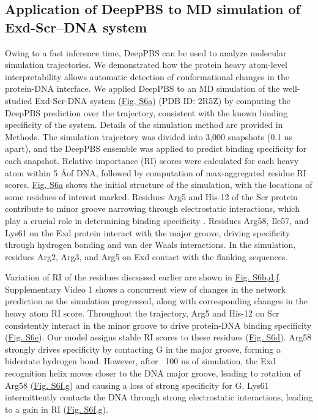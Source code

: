 \subsection{Application of DeepPBS to MD simulation of Exd-Scr–DNA system}

Owing to a fast inference time, DeepPBS can be used to analyze molecular simulation trajectories. We demonstrated how the protein heavy atom-level interpretability allows automatic detection of conformational changes in the protein-DNA interface. We applied DeepPBS to an MD simulation of the well-studied Exd-Scr-DNA system (\hyperref[fig:pdnaS6]{Fig. S6a}) (PDB ID: 2R5Z)\citep{Abe2015, Chiu2022, Ghoshdastidar2022, Slattery2011} by computing the DeepPBS prediction over the trajectory, consistent with the known binding specificity \citep{Abe2015} of the system. Details of the simulation method are provided in Methods. The
simulation trajectory was divided into 3,000 snapshots (0.1 ns apart), and the DeepPBS ensemble was applied to predict binding specificity for each snapshot. Relative importance (RI) scores were calculated for each heavy atom within 5 \AA of DNA, followed by computation of max-aggregated residue RI scores. \hyperref[fig:pdnaS6]{Fig. S6a} shows the initial structure of the simulation, with the locations of some residues of interest marked. Residues Arg5 and His-12 of the Scr protein contribute to minor groove narrowing through electrostatic interactions, which play a crucial role in determining binding specificity \citep{Joshi2007}. 
Residues Arg58, Ile57, and Lys61 on the Exd protein interact with the major groove, driving specificity through hydrogen bonding and van der Waals interactions. In the simulation, residues Arg2, Arg3, and Arg5 on Exd contact with the flanking sequences. 

Variation of RI of the residues discussed earlier are shown in \hyperref[fig:pdnaS6]{Fig. S6b,d,f}. Supplementary Video 1 shows a concurrent view of changes in the network prediction as the simulation progressed, along with corresponding changes in the heavy atom RI score. Throughout the trajectory, Arg5 and His-12 on Scr consistently interact in the minor groove to drive protein-DNA binding specificity (\hyperref[fig:pdnaS6]{Fig. S6e}). Our model assigns stable RI scores to these residues (\hyperref[fig:pdnaS6]{Fig. S6d}). Arg58 strongly drives specificity by contacting G in the major groove, forming a bidentate hydrogen bond. However, after ~100 ns of simulation, the Exd recognition helix moves closer to the DNA major groove, leading to rotation of Arg58 (\hyperref[fig:pdnaS6]{Fig. S6f,g}) and causing a loss of strong specificity for G. Lys61 intermittently contacts the DNA through strong electrostatic interactions, leading to a gain in RI (\hyperref[fig:pdnaS6]{Fig. S6f,g}). 

